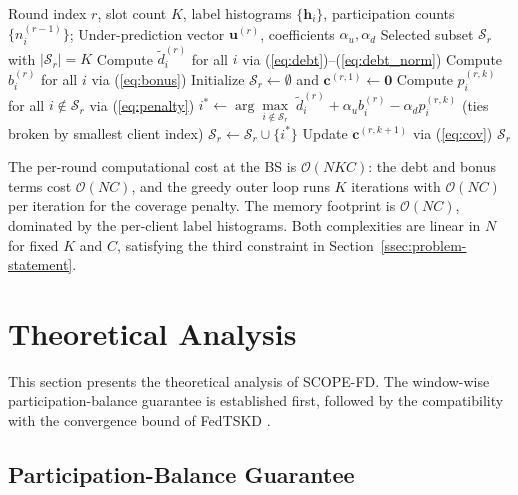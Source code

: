 \documentclass[journal]{IEEEtran}
\begin{document}
\begin{algorithm}[t]
\caption{\small SCOPE-FD Selector at Round $r$}
\label{alg:scopefd}
\begin{algorithmic}[1]
\small
\REQUIRE Round index $r$, slot count $K$, label histograms $\{\bm{h}_i\}$, participation counts $\{n_i^{(r-1)}\}$;
\REQUIRE Under-prediction vector $\bm{u}^{(r)}$, coefficients $\alpha_u, \alpha_d$
\ENSURE Selected subset $\mathcal{S}_r$ with $|\mathcal{S}_r|=K$
\STATE Compute $\tilde{d}_i^{(r)}$ for all $i$ via (\ref{eq:debt})--(\ref{eq:debt_norm})
\STATE Compute $b_i^{(r)}$ for all $i$ via (\ref{eq:bonus})
\STATE Initialize $\mathcal{S}_r \leftarrow \emptyset$ and $\bm{c}^{(r,1)} \leftarrow \bm{0}$
    \STATE Compute $p_i^{(r,k)}$ for all $i \notin \mathcal{S}_r$ via (\ref{eq:penalty})
    \STATE $i^{*} \leftarrow \arg\max\limits_{i \notin \mathcal{S}_r}\;\tilde{d}_i^{(r)} + \alpha_u b_i^{(r)} - \alpha_d p_i^{(r,k)}$ (ties broken by smallest client index)
    \STATE $\mathcal{S}_r \leftarrow \mathcal{S}_r \cup \{i^{*}\}$
    \STATE Update $\bm{c}^{(r,k+1)}$ via (\ref{eq:cov})
\ENDFOR
\RETURN $\mathcal{S}_r$
\end{algorithmic}
\end{algorithm}

The per-round computational cost at the BS is $\mathcal{O}(NKC)$: the debt and bonus terms cost $\mathcal{O}(NC)$, and the greedy outer loop runs $K$ iterations with $\mathcal{O}(NC)$ per iteration for the coverage penalty. The memory footprint is $\mathcal{O}(NC)$, dominated by the per-client label histograms. Both complexities are linear in $N$ for fixed $K$ and $C$, satisfying the third constraint in Section~\ref{ssec:problem-statement}.

\section{Theoretical Analysis}
\label{sec:theory}

This section presents the theoretical analysis of SCOPE-FD. The window-wise participation-balance guarantee is established first, followed by the compatibility with the convergence bound of FedTSKD \cite{mu2024fedtskd}.

\subsection{Participation-Balance Guarantee}
\label{ssec:participation-balance}
\end{document}
